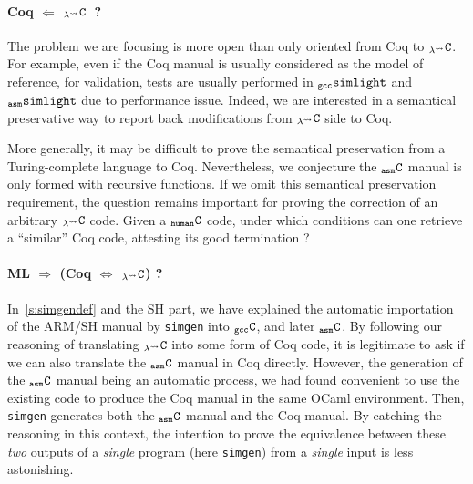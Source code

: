 \documentclass[a4paper, 11pt]{article}
\newcommand{\gccSL}{$_{\tt gcc}{\tt simlight}$\xspace}
\newcommand{\aSL}{$_{\tt asm}{\tt simlight}$\xspace} %
\newcommand{\simgen}{{\tt simgen}\xspace}
\newcommand{\gccC}{$_{\tt gcc}{\tt C}$\xspace}
\newcommand{\hC}{$_{\tt human}{\tt C}$\xspace}
\newcommand{\aC}{$_{\tt asm}{\tt C}$\xspace}
\newcommand{\lC}{$_{\lambda^\leadsto}{\tt C}$\xspace}
\begin{document}
\paragraph{Coq $\Longleftarrow$ \lC~?}
The problem we are focusing is more open than only oriented from Coq to \lC. For example, even if the Coq manual is usually considered as the model of reference, for validation, tests are usually performed in \gccSL and \aSL due to performance issue. Indeed, we are interested in a semantical preservative way to report back modifications from \lC side to Coq. 

More generally, it may be difficult to prove the semantical preservation from a Turing-complete language to Coq. Nevertheless, we conjecture the \aC manual is only formed with recursive functions. If we omit this semantical preservation requirement, the question remains important for proving the correction of an arbitrary \lC code. Given a \hC code, under which conditions can one retrieve a ``similar'' Coq code, attesting its good termination ? 

\paragraph{ML $\Longrightarrow$ (Coq $\Longleftrightarrow$ \lC) ?}

In~\ref{s:simgendef} and the SH part, we have explained the automatic importation of the ARM/SH manual by \simgen into \gccC, and later \aC. By following our reasoning of translating \lC into some form of Coq code, it is legitimate to ask if we can also translate the \aC manual in Coq directly. However, the generation of the \aC manual being an automatic process, we had found convenient to use the existing code to produce the Coq manual in the same OCaml environment. Then, \simgen generates both the \aC manual and the Coq manual. By catching the reasoning in this context, the intention to prove the equivalence between these \emph{two} outputs of a \emph{single} program (here \simgen) from a \emph{single} input is less astonishing. 
\end{document}
